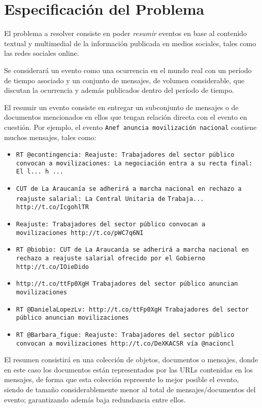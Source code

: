 
\chapter{Especificación del Problema}
\label{sec-3}

\label{cap:problema}

  El problema a resolver consiste en poder \emph{resumir} eventos en base
  al contenido textual y multimedial de la información publicada en
  medios sociales, tales como las redes sociales online.

  Se considerará un evento como una ocurrencia en el mundo real
  con un período de tiempo asociado y un conjunto de mensajes, de
  volumen considerable, que discutan la ocurrencia y además publicados
  dentro del período de tiempo.

  El resumir un evento consiste en entregar un subconjunto de
  mensajes o de documentos mencionados en ellos que tengan
  relación directa con el evento en cuestión. Por ejemplo, el evento
  \texttt{Anef anuncia movilización nacional} contiene muchos mensajes, tales
  como:
\begin{itemize}
\item \texttt{RT @econtingencia: Reajuste: Trabajadores del sector público}
    \texttt{convocan a movilizaciones: La negociación entra a su recta final:}
    \texttt{El l... h ...}
\item \texttt{CUT de La Araucanía se adherirá a marcha nacional en rechazo a}
    \texttt{reajuste salarial: La Central Unitaria de}
    \texttt{Trabaja... http://t.co/IcgohlTR}
\item \texttt{Reajuste: Trabajadores del sector público convocan a}\\
    \texttt{movilizaciones http://t.co/pWC7q6NI}
\item \texttt{RT @biobio: CUT de La Araucanía se adherirá a marcha nacional en}
    \texttt{rechazo a reajuste salarial ofrecido por el Gobierno}
    \texttt{http://t.co/IOieDido}
\item \texttt{http://t.co/ttFp0XgH Trabajadores del sector público anuncian}
    \texttt{movilizaciones}
\item \texttt{RT @DanielaLopezLv: http://t.co/ttFp0XgH Trabajadores del sector}
    \texttt{público anuncian movilizaciones}
\item \texttt{RT @Barbara\_figue: Reajuste: Trabajadores del sector público}
    \texttt{convocan a movilizaciones http://t.co/DeXKACSR vía @nacioncl}
\end{itemize}
  El resumen consistirá en una colección de objetos, documentos o
  mensajes, donde en este caso los documentos están representados por
  las URLs contenidas en los mensajes, de forma que esta colección
  represente lo mejor posible el evento, siendo de tamaño
  considerablemente menor al total de mensajes/documentos del evento;
  garantizando además baja redundancia entre ellos.

